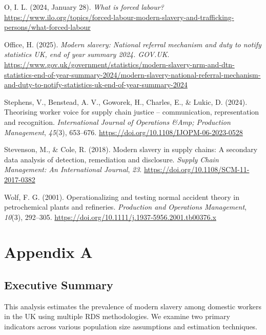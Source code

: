 \documentclass[
  12pt,
]{article}
\newlength{\cslhangindent}
\newenvironment{CSLReferences}[2] %
 {\begin{list}{}{%
  \setlength{\itemindent}{0pt}
  \setlength{\leftmargin}{0pt}
  \setlength{\parsep}{0pt}
  \ifodd #1
   \setlength{\leftmargin}{\cslhangindent}
   \setlength{\itemindent}{-1\cslhangindent}
  \fi
  \setlength{\itemsep}{#2\baselineskip}}}
 {\end{list}}
\theoremstyle{plain}
\theoremstyle{definition}
\begin{document}
\begin{CSLReferences}{1}{0}
O, I. L. (2024, January 28). \emph{What is forced labour?}
\url{https://www.ilo.org/topics/forced-labour-modern-slavery-and-trafficking-persons/what-forced-labour}

Office, H. (2025). \emph{Modern slavery: National referral mechanism and
duty to notify statistics {UK}, end of year summary 2024. {GOV}.{UK}}.
\url{https://www.gov.uk/government/statistics/modern-slavery-nrm-and-dtn-statistics-end-of-year-summary-2024/modern-slavery-national-referral-mechanism-and-duty-to-notify-statistics-uk-end-of-year-summary-2024}

Stephens, V., Benstead, A. V., Goworek, H., Charles, E., \& Lukic, D.
(2024). Theorising worker voice for supply chain justice --
communication, representation and recognition. \emph{International
Journal of Operations \&Amp; Production Management}, \emph{45}(3),
653--676. \url{https://doi.org/10.1108/IJOPM-06-2023-0528}

Stevenson, M., \& Cole, R. (2018). Modern slavery in supply chains: A
secondary data analysis of detection, remediation and disclosure.
\emph{Supply Chain Management: An International Journal}, \emph{23}.
\url{https://doi.org/10.1108/SCM-11-2017-0382}

Wolf, F. G. (2001). Operationalizing and testing normal accident theory
in petrochemical plants and refineries. \emph{Production and Operations
Management}, \emph{10}(3), 292--305.
\url{https://doi.org/10.1111/j.1937-5956.2001.tb00376.x}

\end{CSLReferences}

\newpage

\appendix

\section{Appendix A}\label{appendix-a}

\subsection{Executive Summary}\label{executive-summary}

This analysis estimates the prevalence of modern slavery among domestic
workers in the UK using multiple RDS methodologies. We examine two
primary indicators across various population size assumptions and
estimation techniques.
\end{document}

